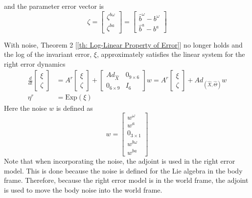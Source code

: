 and the parameter error vector is
\begin{equation}
    \zeta = 
        \begin{bmatrix}
            \zeta^{b \omega} \\
            \zeta^{b a}
        \end{bmatrix}
        =
        \begin{bmatrix}
            \hat{b}^{\omega} - b^{\omega} \\
            \hat{b}^a - b^a
        \end{bmatrix}
    \label{eq: zeta error full}
\end{equation}

With noise, Theorem 2 [\ref{th: Log-Linear Property of Error}] no longer holds and the log of the invariant error, $\xi$, approximately satisfies the linear system for the right error dynamics \cite{Contact-Aided_Invarant_EKF}
\begin{subequations}
    \begin{align}
        \frac{d}{dt} \begin{bmatrix}
            \xi \\
            \zeta
        \end{bmatrix} &= A^r \begin{bmatrix}
            \xi \\
            \zeta
        \end{bmatrix}  + \begin{bmatrix}
            Ad_{\hat{X}} & 0_{9 \times 6} \\
            0_{6 \times 9} & I_6
        \end{bmatrix} w  = A^r \begin{bmatrix}
            \xi \\
            \zeta
        \end{bmatrix} + Ad_{(\hat{X},\hat{\Theta})} w\label{eq: updated adjoint}\\
        \eta^r &= \text{Exp}(\xi) \label{eq: ct right xi diffEq}
    \end{align}
\end{subequations}
Here the noise $w$ is defined as
\begin{equation}
    w = \begin{bmatrix}
    w^{\omega} \\
    w^{a} \\
    0_{3 \times 1} \\
    w^{b \omega} \\
    w^{b a}
    \end{bmatrix} \label{eq: w RInEKF}
\end{equation}
Note that when incorporating the noise, the adjoint is used in the right error model. This is done because the noise is defined for the Lie algebra in the body frame. Therefore, because the right error model is in the world frame, the adjoint is used to move the body noise into the world frame. 

